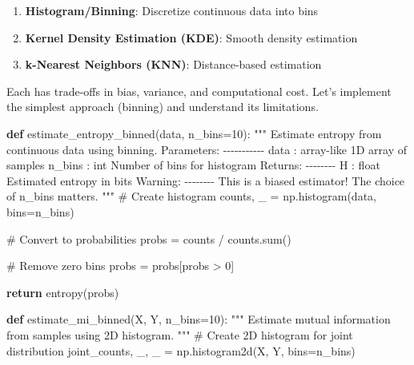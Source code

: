 \documentclass[
  11pt,
  letterpaper,
  oneside,
  openany]{book}
\newenvironment{Shaded}{\begin{snugshade}}{\end{snugshade}}
\newcommand{\BuiltInTok}[1]{\textcolor[rgb]{0.00,0.23,0.31}{#1}}
\newcommand{\CommentTok}[1]{\textcolor[rgb]{0.37,0.37,0.37}{#1}}
\newcommand{\ControlFlowTok}[1]{\textcolor[rgb]{0.00,0.23,0.31}{\textbf{#1}}}
\newcommand{\DecValTok}[1]{\textcolor[rgb]{0.68,0.00,0.00}{#1}}
\newcommand{\KeywordTok}[1]{\textcolor[rgb]{0.00,0.23,0.31}{\textbf{#1}}}
\newcommand{\NormalTok}[1]{\textcolor[rgb]{0.00,0.23,0.31}{#1}}
\newcommand{\OperatorTok}[1]{\textcolor[rgb]{0.37,0.37,0.37}{#1}}
\providecommand{\tightlist}{%
  \setlength{\itemsep}{0pt}\setlength{\parskip}{0pt}}
\begin{document}
\begin{enumerate}
\def\labelenumi{\arabic{enumi}.}
\tightlist
\item
  \textbf{Histogram/Binning}: Discretize continuous data into bins
\item
  \textbf{Kernel Density Estimation (KDE)}: Smooth density estimation
\item
  \textbf{k-Nearest Neighbors (KNN)}: Distance-based estimation
\end{enumerate}

Each has trade-offs in bias, variance, and computational cost. Let's
implement the simplest approach (binning) and understand its
limitations.

\begin{Shaded}
\begin{Highlighting}[]
\KeywordTok{def}\NormalTok{ estimate\_entropy\_binned(data, n\_bins}\OperatorTok{=}\DecValTok{10}\NormalTok{):}
    \CommentTok{"""}
\CommentTok{    Estimate entropy from continuous data using binning.}
\CommentTok{    }
\CommentTok{    Parameters:}
\CommentTok{    {-}{-}{-}{-}{-}{-}{-}{-}{-}{-}{-}}
\CommentTok{    data : array{-}like}
\CommentTok{        1D array of samples}
\CommentTok{    n\_bins : int}
\CommentTok{        Number of bins for histogram}
\CommentTok{        }
\CommentTok{    Returns:}
\CommentTok{    {-}{-}{-}{-}{-}{-}{-}{-}}
\CommentTok{    H : float}
\CommentTok{        Estimated entropy in bits}
\CommentTok{        }
\CommentTok{    Warning:}
\CommentTok{    {-}{-}{-}{-}{-}{-}{-}{-}}
\CommentTok{    This is a biased estimator! The choice of n\_bins matters.}
\CommentTok{    """}
    \CommentTok{\# Create histogram}
\NormalTok{    counts, \_ }\OperatorTok{=}\NormalTok{ np.histogram(data, bins}\OperatorTok{=}\NormalTok{n\_bins)}
    
    \CommentTok{\# Convert to probabilities}
\NormalTok{    probs }\OperatorTok{=}\NormalTok{ counts }\OperatorTok{/}\NormalTok{ counts.}\BuiltInTok{sum}\NormalTok{()}
    
    \CommentTok{\# Remove zero bins}
\NormalTok{    probs }\OperatorTok{=}\NormalTok{ probs[probs }\OperatorTok{\textgreater{}} \DecValTok{0}\NormalTok{]}
    
    \ControlFlowTok{return}\NormalTok{ entropy(probs)}


\KeywordTok{def}\NormalTok{ estimate\_mi\_binned(X, Y, n\_bins}\OperatorTok{=}\DecValTok{10}\NormalTok{):}
    \CommentTok{"""}
\CommentTok{    Estimate mutual information from samples using 2D histogram.}
\CommentTok{    """}
    \CommentTok{\# Create 2D histogram for joint distribution}
\NormalTok{    joint\_counts, \_, \_ }\OperatorTok{=}\NormalTok{ np.histogram2d(X, Y, bins}\OperatorTok{=}\NormalTok{n\_bins)}
    

\end{Highlighting}
\end{Shaded}
\end{document}
